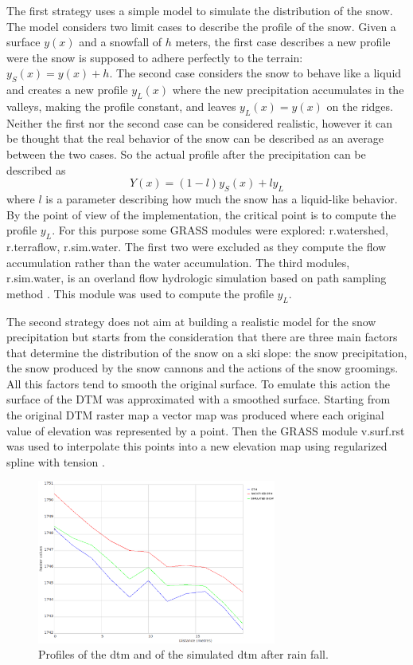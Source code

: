 \documentclass[12pt,a4paper,twoside]{book}
\begin{document}
The first strategy uses a simple model to simulate the distribution of the snow. The model considers two limit cases to describe the profile of the snow. Given a surface $y(x)$ and a snowfall of $h$ meters, the first case describes a new profile were the snow is supposed to adhere perfectly to the terrain: $y_S(x)=y(x)+h$. The second case considers the snow to behave like a liquid and creates a new profile $y_L(x)$ where the new precipitation accumulates in the valleys, making the profile constant, and leaves $y_L(x)=y(x)$ on the ridges. Neither the first nor the second case can be considered realistic, however it can be thought that the real behavior of the snow can be described as an average between the two cases. So the actual profile after the precipitation can be described as
\begin{equation}
Y(x)=(1-l)y_S(x)+ly_L
\end{equation}
where $l$ is a parameter describing how much the snow has a liquid-like behavior. By the point of view of the implementation, the critical point is to compute the profile $y_L$. For this purpose some GRASS modules were explored: r.watershed, r.terraflow, r.sim.water. The first two were excluded as they compute the flow accumulation rather than the water accumulation. The third modules, r.sim.water, is an overland flow hydrologic simulation based on path sampling method \cite{mit2004}. This module was used to compute the profile $y_L$.

The second strategy does not aim at building a realistic model for the snow precipitation but starts from the consideration that there are three main factors that determine the distribution of the snow on a ski slope: the snow precipitation, the snow produced by the snow cannons and the actions of the snow groomings. All this factors tend to smooth the original surface. To emulate this action the surface of the DTM was approximated with a smoothed surface. Starting from the original DTM raster map a vector map was produced where each original value of elevation was represented by a point. Then the GRASS module v.surf.rst was used to interpolate this points into a new elevation map using regularized spline with tension \cite{mit2005}.

\begin{figure}[!h]
  \centering
    \includegraphics[width=0.7\textwidth]{images/profiles_dtm.eps}
    \caption{Profiles of the dtm and of the simulated dtm after rain fall.}\label{profile_dtm}
\end{figure}
\end{document}
